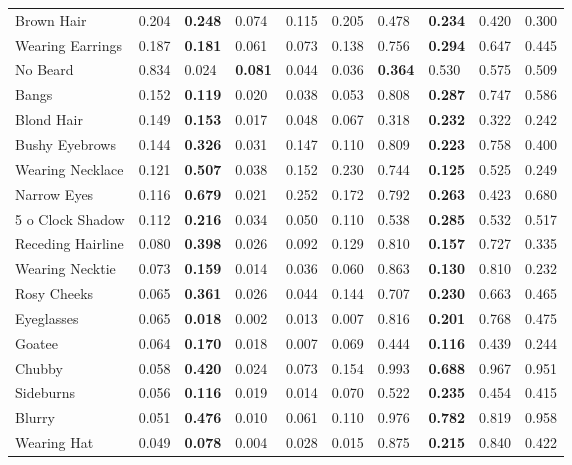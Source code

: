 \begin{tabular}{lrllrrllrr}
 Brown Hair          & 0.204 & \bf 0.248 & 0.074     & 0.115 & 0.205 & 0.478     & \bf 0.234 & 0.420 & 0.300 \\
 Wearing Earrings    & 0.187 & \bf 0.181 & 0.061     & 0.073 & 0.138 & 0.756     & \bf 0.294 & 0.647 & 0.445 \\
 No Beard            & 0.834 & 0.024     & \bf 0.081 & 0.044 & 0.036 & \bf 0.364 & 0.530     & 0.575 & 0.509 \\
 Bangs               & 0.152 & \bf 0.119 & 0.020     & 0.038 & 0.053 & 0.808     & \bf 0.287 & 0.747 & 0.586 \\
 Blond Hair          & 0.149 & \bf 0.153 & 0.017     & 0.048 & 0.067 & 0.318     & \bf 0.232 & 0.322 & 0.242 \\
 Bushy Eyebrows      & 0.144 & \bf 0.326 & 0.031     & 0.147 & 0.110 & 0.809     & \bf 0.223 & 0.758 & 0.400 \\
 Wearing Necklace    & 0.121 & \bf 0.507 & 0.038     & 0.152 & 0.230 & 0.744     & \bf 0.125 & 0.525 & 0.249 \\
 Narrow Eyes         & 0.116 & \bf 0.679 & 0.021     & 0.252 & 0.172 & 0.792     & \bf 0.263 & 0.423 & 0.680 \\
 5 o Clock Shadow    & 0.112 & \bf 0.216 & 0.034     & 0.050 & 0.110 & 0.538     & \bf 0.285 & 0.532 & 0.517 \\
 Receding Hairline   & 0.080 & \bf 0.398 & 0.026     & 0.092 & 0.129 & 0.810     & \bf 0.157 & 0.727 & 0.335 \\
 Wearing Necktie     & 0.073 & \bf 0.159 & 0.014     & 0.036 & 0.060 & 0.863     & \bf 0.130 & 0.810 & 0.232 \\
 Rosy Cheeks         & 0.065 & \bf 0.361 & 0.026     & 0.044 & 0.144 & 0.707     & \bf 0.230 & 0.663 & 0.465 \\
 Eyeglasses          & 0.065 & \bf 0.018 & 0.002     & 0.013 & 0.007 & 0.816     & \bf 0.201 & 0.768 & 0.475 \\
 Goatee              & 0.064 & \bf 0.170 & 0.018     & 0.007 & 0.069 & 0.444     & \bf 0.116 & 0.439 & 0.244 \\
 Chubby              & 0.058 & \bf 0.420 & 0.024     & 0.073 & 0.154 & 0.993     & \bf 0.688 & 0.967 & 0.951 \\
 Sideburns           & 0.056 & \bf 0.116 & 0.019     & 0.014 & 0.070 & 0.522     & \bf 0.235 & 0.454 & 0.415 \\
 Blurry              & 0.051 & \bf 0.476 & 0.010     & 0.061 & 0.110 & 0.976     & \bf 0.782 & 0.819 & 0.958 \\
 Wearing Hat         & 0.049 & \bf 0.078 & 0.004     & 0.028 & 0.015 & 0.875     & \bf 0.215 & 0.840 & 0.422 \\

\end{tabular}
